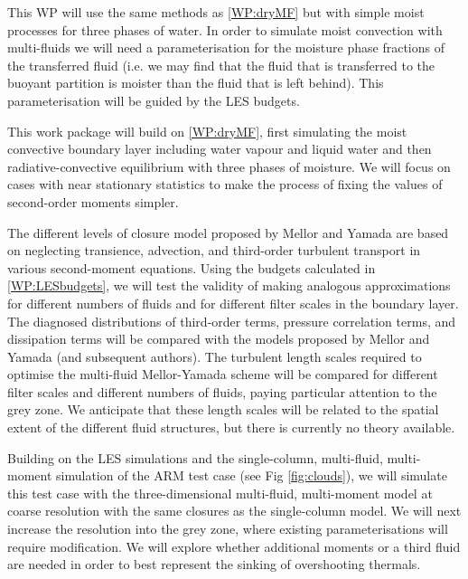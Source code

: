 \documentclass[11pt,a4paper]{article}
\begin{document}

This WP will use the same methods as \ref{WP:dryMF} but with simple moist processes for three phases of water. In order to simulate moist convection with multi-fluids we will need a parameterisation for the moisture phase fractions of the transferred fluid (i.e. we may find that the fluid that is transferred to the buoyant partition is moister than the fluid that is left behind). This parameterisation will be guided by the LES budgets. 

This work package will build on \ref{WP:dryMF}, first simulating the moist convective boundary layer including water vapour and liquid water and then radiative-convective equilibrium with three phases of moisture. We will focus on cases with near stationary statistics to make the process of fixing the values of second-order moments simpler.


The different levels of closure model proposed by Mellor and Yamada are based on neglecting transience, advection, and third-order turbulent transport in various second-moment equations. Using the budgets calculated in \ref{WP:LESbudgets}, we will test the validity of making analogous approximations for different numbers of fluids and for different filter scales in the boundary layer. The diagnosed distributions of third-order terms, pressure correlation terms, and dissipation terms will be compared with the models proposed by Mellor and Yamada (and subsequent authors). The turbulent length scales required to optimise the multi-fluid Mellor-Yamada scheme will be compared for different filter scales and different numbers of fluids, paying particular attention to the grey zone. We anticipate that these length scales will be related to the spatial extent of the different fluid structures, but there is currently no theory available. 


Building on the LES simulations and the single-column, multi-fluid, multi-moment simulation of the ARM test case (see Fig \ref{fig:clouds}), we will simulate this test case with the three-dimensional multi-fluid, multi-moment model at coarse resolution with the same closures as the single-column model.  We will next increase the resolution into the grey zone, where existing parameterisations will require modification. We will explore whether additional moments or a third fluid are needed in order to best represent the sinking of overshooting thermals. 
\end{document}

